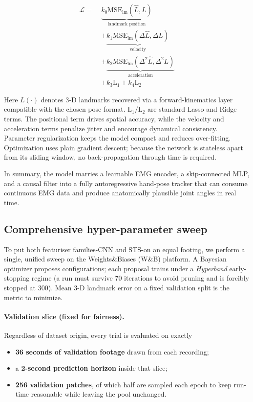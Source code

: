 \begin{align*}
\mathcal{L} =\;&
\underbrace{k_0\mathrm{MSE}_{\text{lm}}(\hat L, L)}_{\text{landmark position}} \\
&+ \underbrace{k_1\mathrm{MSE}_{\text{lm}}(\Delta \hat L, \Delta L)}_{\text{velocity}} \\
&+ \underbrace{k_2\mathrm{MSE}_{\text{lm}}(\Delta^{2} \hat L, \Delta^{2} L)}_{\text{acceleration}} \\
&+ k_3\text{L}_{1} + k_4\text{L}_{2}
\end{align*}

Here \(L(\cdot)\) denotes 3-D landmarks recovered via a forward-kinematics layer
compatible with the chosen pose format. $\text{L}_{1} / \text{L}_{2}$ are standard Lasso and Ridge terms. The positional term drives spatial
accuracy, while the velocity and acceleration terms penalize jitter and
encourage dynamical consistency. Parameter regularization keeps the model
compact and reduces over-fitting.
Optimization uses plain gradient descent; because the network is stateless
apart from its sliding window, no back-propagation through time is required.

\medskip\noindent
In summary, the model marries a learnable EMG encoder, a skip-connected MLP,
and a causal filter into a fully autoregressive hand-pose tracker that can
consume continuous EMG data and produce anatomically plausible joint angles in
real time.

\subsection{Comprehensive hyper-parameter sweep}

To put both featuriser families-CNN and STS-on an equal footing, we perform a
single, unified sweep on the Weights\&Biases (W\&B) platform.
A Bayesian optimizer proposes configurations; each proposal trains under a
\emph{Hyperband} early-stopping regime (a run must survive 70 iterations to
avoid pruning and is forcibly stopped at 300).
Mean 3-D landmark error on a fixed validation split is the metric to minimize.

\paragraph{Validation slice (fixed for fairness).}
Regardless of dataset origin, every trial is evaluated on exactly

\begin{itemize}
  \item \textbf{36 seconds of validation footage} drawn from each recording;
  \item a \textbf{2-second prediction horizon} inside that slice;
  \item \textbf{256 validation patches}, of which half are sampled each epoch
        to keep run-time reasonable while leaving the pool unchanged.
\end{itemize}


